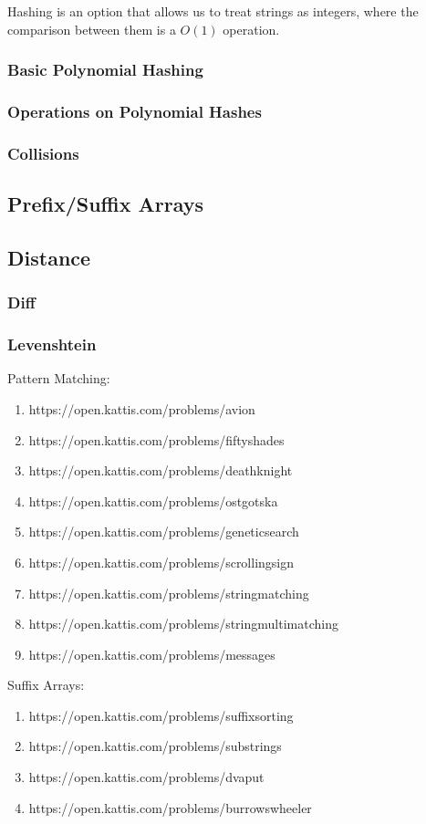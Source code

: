 Hashing is an option that allows us to treat strings as integers, where the comparison between them is a $O(1)$ operation.

\subsubsection{Basic Polynomial Hashing}
\subsubsection{Operations on Polynomial Hashes}
\subsubsection{Collisions}
\subsection{Prefix/Suffix Arrays}
\subsection{Distance}
\subsubsection{Diff}
\subsubsection{Levenshtein}

\hrulefill

Pattern Matching:
\begin{enumerate}
\item https://open.kattis.com/problems/avion
\item https://open.kattis.com/problems/fiftyshades
\item https://open.kattis.com/problems/deathknight
\item https://open.kattis.com/problems/ostgotska
\item https://open.kattis.com/problems/geneticsearch
\item https://open.kattis.com/problems/scrollingsign
\item https://open.kattis.com/problems/stringmatching
\item https://open.kattis.com/problems/stringmultimatching
\item https://open.kattis.com/problems/messages
\end{enumerate}

Suffix Arrays:
\begin{enumerate}
\item https://open.kattis.com/problems/suffixsorting
\item https://open.kattis.com/problems/substrings
\item https://open.kattis.com/problems/dvaput
\item https://open.kattis.com/problems/burrowswheeler
\end{enumerate}
